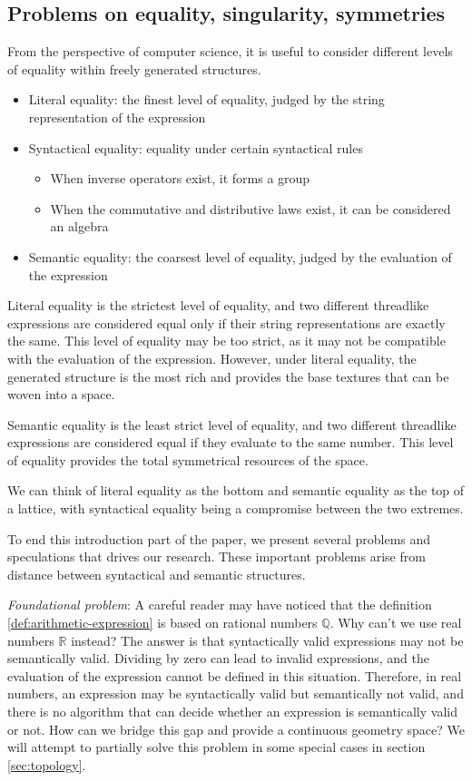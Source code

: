 \subsection{Problems on equality, singularity, symmetries}

From the perspective of computer science, it is useful to consider different levels of equality within freely generated structures.
\begin{itemize}
\item Literal equality: the finest level of equality, judged by the string representation of the expression
\item Syntactical equality: equality under certain syntactical rules
\begin{itemize}
\item When inverse operators exist, it forms a group
\item When the commutative and distributive laws exist, it can be considered an algebra
\end{itemize}
\item Semantic equality: the coarsest level of equality, judged by the evaluation of the expression
\end{itemize}

Literal equality is the strictest level of equality, and two different threadlike expressions are considered equal only if their string representations are exactly the same.
This level of equality may be too strict, as it may not be compatible with the evaluation of the expression.
However, under literal equality, the generated structure is the most rich and provides the base textures that can be woven into a space.

Semantic equality is the least strict level of equality, and two different threadlike expressions are considered equal if they evaluate to the same number.
This level of equality provides the total symmetrical resources of the space.

We can think of literal equality as the bottom and semantic equality as the top of a lattice,
with syntactical equality being a compromise between the two extremes.

To end this introduction part of the paper, we present several problems and speculations that drives our research.
These important problems arise from distance between syntactical and semantic structures.

\emph{Foundational problem}: A careful reader may have noticed that the definition \ref{def:arithmetic-expression}
is based on rational numbers $\mathbb{Q}$. Why can't we use real numbers $\mathbb{R}$ instead? The answer is that
syntactically valid expressions may not be semantically valid. Dividing by zero can lead to invalid expressions,
and the evaluation of the expression cannot be defined in this situation. Therefore, in real numbers,
an expression may be syntactically valid but semantically not valid,
and there is no algorithm that can decide whether an expression is semantically valid or not.
How can we bridge this gap and provide a continuous geometry space?
We will attempt to partially solve this problem in some special cases in section \ref{sec:topology}.

